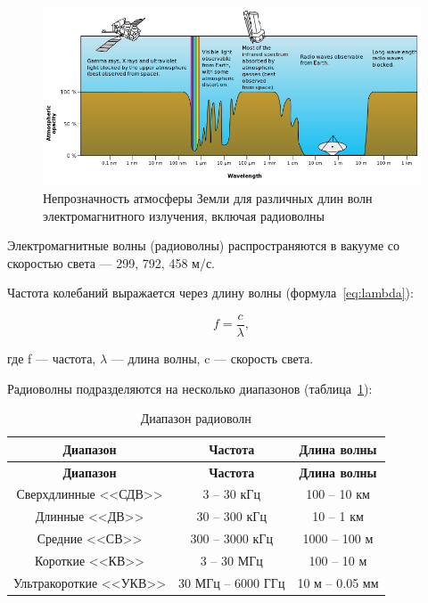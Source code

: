 \begin{figure}[ht]
    \includegraphics[width=1\linewidth]{Figures/radiowaves.png}
    \caption{Непрозначность атмосферы Земли для различных длин волн электромагнитного излучения, включая радиоволны}
    \label{fig:atmosphere}
\end{figure}

Электромагнитные волны (радиоволны) распространяются в вакууме со скоростью света --- 299, 792, 458 м/с.

Частота колебаний выражается через длину волны (формула~\eqref{eq:lambda}):

\begin{equation}
    \label{eq:lambda}
    f = \frac{c}{\lambda},
\end{equation}

где f --- частота, $\lambda$ --- длина волны, c --- скорость света.

Радиоволны подразделяются на несколько диапазонов (таблица~\ref{tab:radiorange}):

\begin{longtable}[c]{|c|c|c|}
    \caption{Диапазон радиоволн}
    \label{tab:radiorange}\\
    \hline
    \textbf{Диапазон} & \textbf{Частота} & \textbf{Длина волны}\\
    \hline
    \endfirsthead
    \hline
    \textbf{Диапазон} & \textbf{Частота} & \textbf{Длина волны}\\
    \hline
    \endhead
        Сверхдлинные <<СДВ>> & 3 -- 30 кГц & 100 -- 10 км\\
        \hline
        Длинные <<ДВ>> & 30 -- 300 кГц & 10 -- 1 км\\
        \hline
        Средние <<СВ>> & 300 -- 3000 кГц & 1000 -- 100 м\\
        \hline
        Короткие <<КВ>> & 3 -- 30 МГц & 100 -- 10 м\\
        \hline
        Ультракороткие <<УКВ>> & 30 МГц -- 6000 ГГц & 10 м -- 0.05 мм\\
        \hline
\end{longtable}

